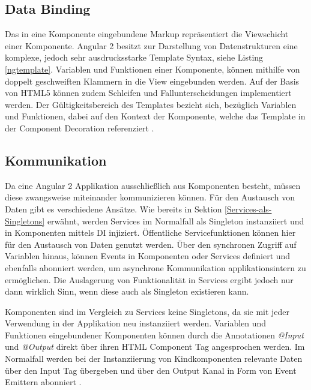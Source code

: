 \subsection{Data Binding}
Das in eine Komponente eingebundene Markup repräsentiert die Viewschicht einer Komponente.
Angular 2 besitzt zur Darstellung von Datenstrukturen eine komplexe, jedoch sehr ausdrucksstarke Template Syntax, siehe Listing \ref{ngtemplate}.
Variablen und Funktionen einer Komponente, können mithilfe von doppelt geschweiften Klammern in die View eingebunden werden.
Auf der Basis von HTML5 können zudem Schleifen und Fallunterscheidungen implementiert werden.
Der Gültigkeitsbereich des Templates bezieht sich, bezüglich Variablen und Funktionen, dabei auf den Kontext der Komponente,
welche das Template in der Component Decoration referenziert \cite{Templ78:online}.

\vspace{0.3cm}


\subsection{Kommunikation}

Da eine Angular 2 Applikation ausschließlich aus Komponenten besteht, müssen diese zwangsweise miteinander
kommunizieren können. Für den Austausch von Daten gibt es verschiedene Ansätze.
Wie bereits in Sektion \ref{Services-als-Singletons} erwähnt, werden Services im Normalfall als Singleton
instanziiert und in Komponenten mittels \ac{DI} injiziert. Öffentliche Servicefunktionen können hier für den
Austausch von Daten genutzt werden. Über den synchronen Zugriff auf Variablen hinaus,
können Events in Komponenten oder Services definiert und ebenfalls abonniert werden,
um asynchrone Kommunikation applikationsintern zu ermöglichen. Die Auslagerung von Funktionalität in Services ergibt jedoch nur dann wirklich Sinn,
wenn diese auch als Singleton existieren kann.

Komponenten sind im Vergleich zu Services keine Singletons,
da sie mit jeder Verwendung in der Applikation neu instanziiert werden.
Variablen und Funktionen eingebundener Komponenten können durch die Annotationen \emph{@Input} und \emph{@Output}
direkt über ihren HTML Component Tag angesprochen werden. Im Normalfall werden bei der Instanziierung von Kindkomponenten
relevante Daten über den Input Tag übergeben und über den Output Kanal in Form von Event Emittern abonniert \cite{Angul94:online}.

